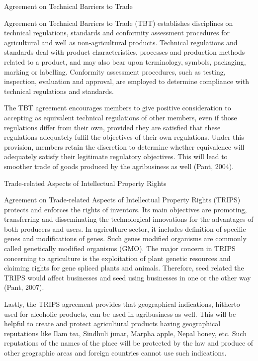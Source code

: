 \documentclass[
  openany]{book}
\begin{document}
Agreement on Technical Barriers to Trade

Agreement on Technical Barriers to Trade (TBT) establishes disciplines on technical regulations, standards and conformity assessment procedures for agricultural and well as non-agricultural products. Technical regulations and standards deal with product characteristics, processes and production methods related to a product, and may also bear upon terminology, symbols, packaging, marking or labelling. Conformity assessment procedures, such as testing, inspection, evaluation and approval, are employed to determine compliance with technical regulations and standards.

The TBT agreement encourages members to give positive consideration to accepting as equivalent technical regulations of other members, even if those regulations differ from their own, provided they are satisfied that these regulations adequately fulfil the objectives of their own regulations. Under this provision, members retain the discretion to determine whether equivalence will adequately satisfy their legitimate regulatory objectives. This will lead to smoother trade of goods produced by the agribusiness as well (Pant, 2004).

Trade-related Aspects of Intellectual Property Rights

Agreement on Trade-related Aspects of Intellectual Property Rights (TRIPS) protects and enforces the rights of inventors. Its main objectives are promoting, transferring and disseminating the technological innovations for the advantages of both producers and users. In agriculture sector, it includes definition of specific genes and modifications of genes. Such genes modified organisms are commonly called genetically modified organisms (GMO). The major concern in TRIPS concerning to agriculture is the exploitation of plant genetic resources and claiming rights for gene spliced plants and animals. Therefore, seed related the TRIPS would affect businesses and seed using businesses in one or the other way (Pant, 2007).

Lastly, the TRIPS agreement provides that geographical indications, hitherto used for alcoholic products, can be used in agribusiness as well. This will be helpful to create and protect agricultural products having geographical reputations like Ilam tea, Sindhuli junar, Marpha apple, Nepal honey, etc. Such reputations of the names of the place will be protected by the law and produce of other geographic areas and foreign countries cannot use such indications.
\end{document}
